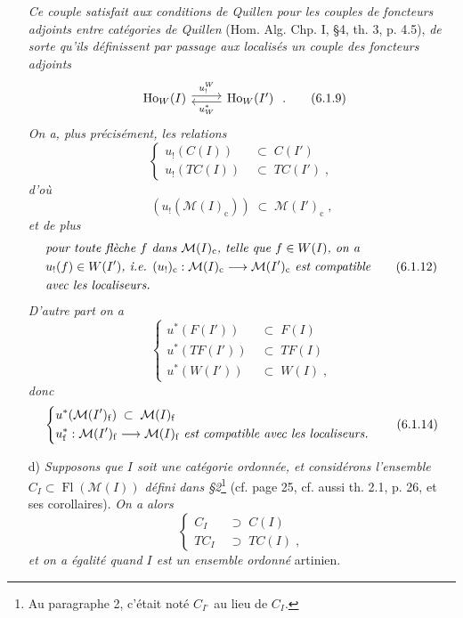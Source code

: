 \documentclass[11pt]{article}
\newcommand{\msp}[1]{\marginpar{\footnotesize [#1]}}
\newcommand{\Fl}{\operatorname{Fl}}
\begin{document}
\begin{itemize}[leftmargin=2.5em]
\msp{page 100}
\textit{Ce couple satisfait aux conditions de Quillen pour les couples de foncteurs adjoints entre catégories de Quillen} (Hom. Alg. Chp. I, §4, th. 3, p. 4.5), \textit{de sorte qu'ils définissent par passage aux localisés un couple des foncteurs adjoints}
\[
\begin{tikzcd}
\mathrm{Ho}_W(I) \arrow[r, shift left, "u_!^{W}"] & \mathrm{Ho}_W(I') \arrow[l, shift left, "u^{*}_{W}"]
\end{tikzcd}
\;.
\tag*{(6.1.9)}
\]
\textit{On a, plus précisément, les relations}
\[
\left\{
\begin{aligned}
u_!(C(I)) \;&\subset\; C(I')\\
u_!(TC(I)) \;&\subset\; TC(I')\;,
\end{aligned}
\right.
\tag*{(6.1.10)}
\]
\textit{d'où}
\[
(u_!(\mathcal{M}(I)_{\mathrm{c}})) \;\subset\; \mathcal{M}(I')_{\mathrm{c}}\;,
\tag*{(6.1.11)}
\]
\textit{et de plus}
\[
\begin{aligned}
&\text{\textit{pour toute flèche $f$ dans $\mathcal{M}(I)_{\mathrm{c}}$, telle que $f \in W(I)$, on a}}\\
&\text{\textit{$u_!(f) \in W(I')$, i.e. $(u_!)_{\mathrm{c}} : \mathcal{M}(I)_{\mathrm{c}} \longrightarrow \mathcal{M}(I')_{\mathrm{c}}$ est compatible}}\\
&\text{\textit{avec les localiseurs.}}
\end{aligned}
\tag*{(6.1.12)}
\]
\textit{D'autre part on a}
\[
\left\{
\begin{aligned}
u^{*}(F(I')) \;&\subset\; F(I)\\
u^{*}(TF(I')) \;&\subset\; TF(I)\\
u^{*}(W(I')) \;&\subset\; W(I)\;,
\end{aligned}
\right.
\tag*{(6.1.13)}
\]
\textit{donc}
\[
\left\{
\begin{aligned}
&u^{*}(\mathcal{M}(I')_{\mathrm{f}}) \;\subset\; \mathcal{M}(I)_{\mathrm{f}}\\
&u^{*}_{\mathrm{f}} : \mathcal{M}(I')_{\mathrm{f}} \longrightarrow \mathcal{M}(I)_{\mathrm{f}} \text{ \textit{est compatible avec les localiseurs.}}
\end{aligned}
\right.
\tag*{(6.1.14)}
\]

\msp{page 101}
\item[d)] \textit{Supposons que $I$ soit une catégorie ordonnée, et considérons l'ensemble $C_I \subset \Fl(\mathcal{M}(I))$ défini dans §2}\footnote[30]{Au paragraphe 2, c'était noté $C_{I^{\circ}}$ au lieu de $C_I$.} (cf. page 25, cf. aussi th. 2.1, p. 26, et ses corollaires). \textit{On a alors}
\[
\left\{
\begin{aligned}
C_I \;&\supset\; C(I)\\
TC_I \;&\supset\; TC(I)\;,
\end{aligned}
\right.
\tag*{(6.1.15)}
\]
\textit{et on a égalité quand $I$ est un ensemble ordonné} artinien.
\end{itemize}
\end{document}
